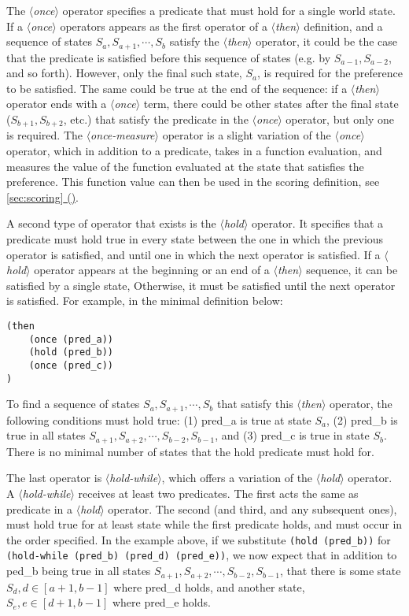 \documentclass{article}
\newcommand{\dsl}[1]{{\it $\langle$#1$\rangle$}}
\newcommand*{\fullref}[1]{\hyperref[{#1}]{\autoref*{#1} (\nameref*{#1})}} %
\begin{document}
The \dsl{once} operator specifies a predicate that must hold for a single world state. 
If a \dsl{once} operators appears as the first operator of a \dsl{then} definition, and a sequence of states $S_a, S_{a+1}, \cdots, S_b$ satisfy the \dsl{then} operator, it could be the case that the predicate is satisfied before this sequence of states (e.g. by $S_{a-1}, S_{a-2}$, and so forth). 
However, only the final such state, $S_a$, is required for the preference to be satisfied.
The same could be true at the end of the sequence: if a \dsl{then} operator ends with a \dsl{once} term, there could be other states after the final state ($S_{b+1}, S_{b+2}$, etc.) that satisfy the predicate in the \dsl{once} operator, but only one is required. 
The \dsl{once-measure} operator is a slight variation of the \dsl{once} operator, which in addition to a predicate, takes in a function evaluation, and measures the value of the function evaluated at the state that satisfies the preference.
This function value can then be used in the scoring definition, see \fullref{sec:scoring}.

A second type of operator that exists is the \dsl{hold} operator.
It specifies that a predicate must hold true in every state between the one in which the previous operator is satisfied, and until one in which the next operator is satisfied. 
If a \dsl{hold} operator appears at the beginning or an end of a \dsl{then} sequence, it can be satisfied by a single state, 
Otherwise, it must be satisfied until the next operator is satisfied. 
For example, in the minimal definition below: 
\begin{lstlisting}
(then
    (once (pred_a))
    (hold (pred_b)) 
    (once (pred_c))
)
\end{lstlisting}
To find a sequence of states $S_a, S_{a+1}, \cdots, S_b$ that satisfy this \dsl{then} operator, the following conditions must hold true: (1) pred_a is true at state $S_a$, (2) pred_b is true in all states $S_{a+1}, S_{a+2}, \cdots, S_{b-2}, S_{b-1}$, and (3) pred_c is true in state $S_b$.
There is no minimal number of states that the hold predicate must hold for. 

The last operator is \dsl{hold-while}, which offers a variation of the \dsl{hold} operator.
A \dsl{hold-while} receives at least two predicates. 
The first acts the same as predicate in a \dsl{hold} operator. 
The second (and third, and any subsequent ones), must hold true for at least state while the first predicate holds, and must occur in the order specified. 
In the example above, if we substitute \lstinline{(hold (pred_b))} for \lstinline{(hold-while (pred_b) (pred_d) (pred_e))}, we now expect that in addition to ped_b being true in all states $S_{a+1}, S_{a+2}, \cdots, S_{b-2}, S_{b-1}$, that there is some state $S_d, d \in [a+1, b-1]$ where pred_d holds, and another state, $S_e, e \in [d+1, b-1]$ where pred_e holds. 
        
\end{document}
